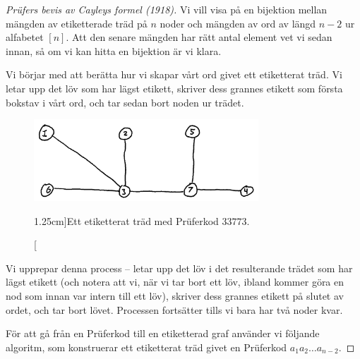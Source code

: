 \documentclass[nobib]{tufte-handout}
\begin{document}
\begin{proof}[Prüfers bevis av Cayleys formel (1918)]
    Vi vill visa på en bijektion mellan mängden av etiketterade träd på $n$ noder och mängden av ord av längd $n-2$ ur alfabetet $[n]$. Att den senare mängden har rätt antal element vet vi sedan innan, så om vi kan hitta en bijektion är vi klara.

    Vi börjar med att berätta hur vi skapar vårt ord givet ett etiketterat träd. Vi letar upp det löv som har lägst etikett, skriver dess grannes etikett som första bokstav i vårt ord, och tar sedan bort noden ur trädet.

    \begin{figure}
        \centering
        \includegraphics[width=0.75\textwidth]{graphics/prufer_code_tree_example.png}
        \caption[][1.25cm]{Ett etiketterat träd med Prüferkod $33773$.}
    \end{figure}

    Vi upprepar denna process -- letar upp det löv i det resulterande trädet som har lägst etikett (och notera att vi, när vi tar bort ett löv, ibland kommer göra en nod som innan var intern till ett löv), skriver dess grannes etikett på slutet av ordet, och tar bort lövet. Processen fortsätter tills vi bara har två noder kvar.

    För att gå från en Prüferkod till en etiketterad graf använder vi följande algoritm, som konstruerar ett etiketterat träd givet en Prüferkod $a_1a_2\ldots a_{n-2}$.


\end{proof}
\end{document}
